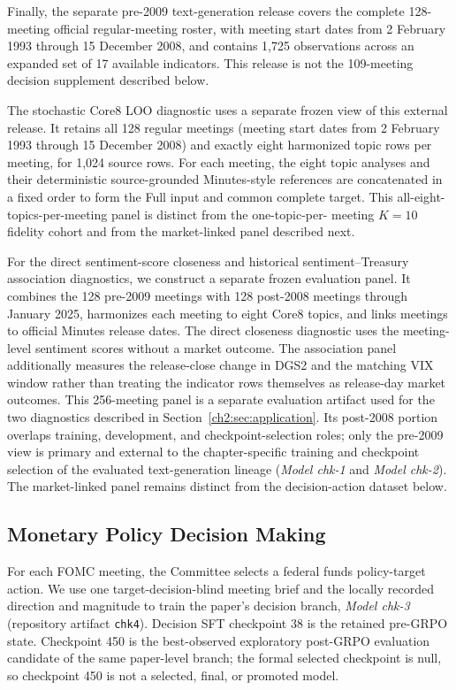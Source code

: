 Finally, the separate pre-2009 text-generation release covers the complete
128-meeting official regular-meeting roster, with meeting start dates from
2 February 1993 through 15 December 2008, and contains 1,725 observations
across an expanded set of 17 available indicators. This release is not the
109-meeting decision supplement described below.

The stochastic Core8 LOO diagnostic uses a separate frozen view of this
external release. It retains all 128 regular meetings (meeting start dates from
2 February 1993 through 15 December 2008) and exactly eight harmonized topic
rows per meeting, for 1,024 source rows. For each meeting, the eight topic
analyses and their deterministic source-grounded Minutes-style references are
concatenated in a fixed order to form the Full input and common complete target.
This all-eight-topics-per-meeting panel is distinct from the one-topic-per-
meeting $K=10$ fidelity cohort and from the market-linked panel described next.

For the direct sentiment-score closeness and historical sentiment--Treasury
association diagnostics, we construct a separate frozen evaluation panel. It
combines the 128 pre-2009 meetings with 128 post-2008 meetings through January
2025, harmonizes each meeting to eight Core8 topics, and links meetings to
official Minutes release dates. The direct closeness diagnostic uses the
meeting-level sentiment scores without a market outcome. The association panel
additionally measures the release-close change in DGS2 and the matching VIX
window rather than treating the indicator rows themselves as release-day market
outcomes. This 256-meeting panel is a separate evaluation artifact used for the
two diagnostics described in Section~\ref{ch2:sec:application}. Its post-2008
portion overlaps training, development, and checkpoint-selection roles; only
the pre-2009 view is primary and external to the chapter-specific training and
checkpoint selection of the evaluated text-generation lineage
(\textit{Model chk-1} and \textit{Model chk-2}).
The market-linked panel remains distinct from the decision-action dataset below.



\subsection*{Monetary Policy Decision Making}

For each FOMC meeting, the Committee selects a federal funds policy-target
action. We use one target-decision-blind meeting brief and the locally recorded
direction and magnitude to train the paper's decision branch,
\textit{Model chk-3} (repository artifact \texttt{chk4}). Decision SFT
checkpoint 38 is the retained pre-GRPO state. Checkpoint 450 is the
best-observed exploratory post-GRPO evaluation candidate of the same
paper-level branch; the formal selected checkpoint is null, so checkpoint 450
is not a selected, final, or promoted model.

